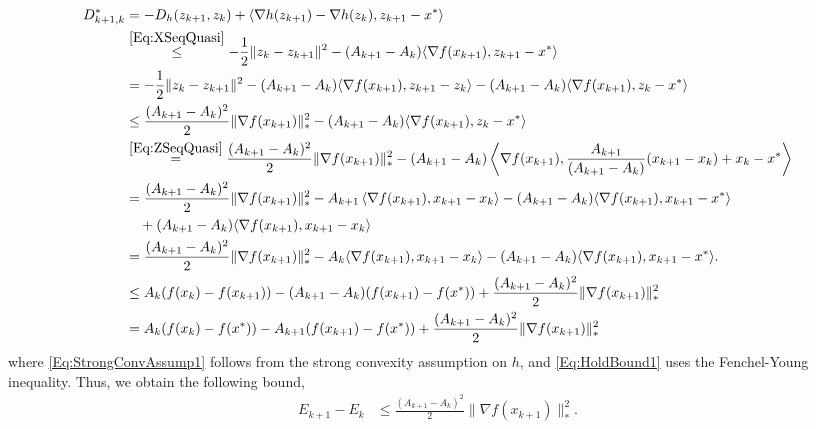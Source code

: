 \documentclass[11pt]{article}
\theoremstyle{plain}
\begin{document}
\begin{subequations}
\begin{align}
D^\ast_{k+1, k}  &= -D_h(z_{k+1}, z_k) +  \langle \nabla h(z_{k+1}) - \nabla h(z_k), z_{k+1} - x^\ast\rangle \label{Eq:Mirror}\\
&\overset{\eqref{Eq:XSeqQuasi}}{\leq} -\frac{1}{2}\|z_k - z_{k+1}\|^2 -(A_{k+1} -A_{k}) \langle \nabla f(x_{k+1}), z_{k+1} - x^\ast\rangle \label{Eq:StrongConvAssump1} \\
&= -\frac{1}{2}\|z_k - z_{k+1}\|^2 - (A_{k+1} -A_{k}) \langle \nabla f(x_{k+1}), z_{k+1} - z_k\rangle -(A_{k+1} -A_{k}) \langle \nabla f(x_{k+1}), z_k - x^\ast\rangle \notag\\
&\leq\frac{(A_{k+1} -A_{k})^2}{2} \|\nabla f(x_{k+1})\|_\ast^2 - (A_{k+1} -A_{k}) \langle \nabla f(x_{k+1}), z_k - x^\ast\rangle \label{Eq:HoldBound1}\\
& \overset{\eqref{Eq:ZSeqQuasi}}{=}\frac{(A_{k+1} -A_{k})^2}{2} \|\nabla f(x_{k+1})\|_\ast^2 - (A_{k+1} - A_k) \left\langle \nabla f(x_{k+1}), \frac{A_{k+1}}{(A_{k+1} -A_{k})}(x_{k+1} - x_k) + x_k - x^\ast\right\rangle \notag \\
& =\frac{(A_{k+1} -A_{k})^2}{2} \|\nabla f(x_{k+1})\|_\ast^2- A_{k+1} \left\langle \nabla f(x_{k+1}), x_{k+1} - x_k\right\rangle - (A_{k+1} -A_{k})\langle \nabla f(x_{k+1}), x_{k+1} - x^\ast\rangle \notag\\
&\quad + (A_{k+1} -A_{k})\langle \nabla f(x_{k+1}), x_{k+1} - x_k \rangle \notag\\
& = \frac{(A_{k+1} -A_{k})^2}{2} \|\nabla f(x_{k+1})\|_\ast^2- A_{k} \langle \nabla f(x_{k+1}), x_{k+1} - x_k\rangle  - (A_{k+1} -A_{k})\langle \nabla f(x_{k+1}), x_{k+1} - x^\ast\rangle. \notag\\
&\leq A_k(f(x_{k}) - f(x_{k+1})) - (A_{k+1} -A_{k})(f(x_{k+1}) - f(x^\ast)) + \frac{(A_{k+1} -A_{k})^2}{2} \|\nabla f(x_{k+1})\|_\ast^2 \notag\\
& = A_k (f(x_k) - f(x^\ast)) - A_{k+1}(f(x_{k+1}) - f(x^\ast)) + \frac{(A_{k+1} -A_{k})^2}{2} \|\nabla f(x_{k+1})\|_\ast^2 \notag
\end{align}
\end{subequations}
where \eqref{Eq:StrongConvAssump1} follows from the strong convexity assumption on $h$, and \eqref{Eq:HoldBound1} uses the Fenchel-Young inequality. Thus, we obtain the following bound,
\begin{subequations}
\begin{align*}
E_{k+1} - E_k &\leq  \frac{(A_{k+1} -A_{k})^2}{2} \|\nabla f(x_{k+1})\|_\ast^2. 
\end{align*}
\end{subequations}
\end{document}
